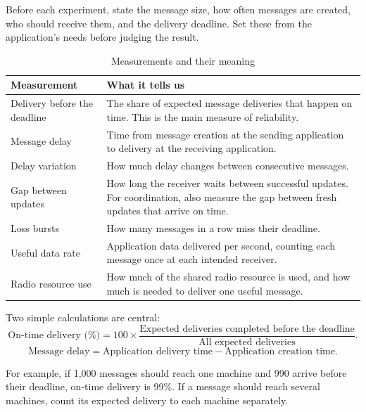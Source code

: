 \documentclass[11pt,a4paper]{article}
\begin{document}
Before each experiment, state the message size, how often messages are
created, who should receive them, and the delivery deadline. Set these from
the application's needs before judging the result.

\begin{table}[htbp]
\centering
\caption{Measurements and their meaning}
\label{tab:metrics}
\small
\begin{tabularx}{\textwidth}{lY}
\toprule
\textbf{Measurement} & \textbf{What it tells us} \\
\midrule
Delivery before the deadline &
The share of expected message deliveries that happen on time. This is the
main measure of reliability. \\
Message delay &
Time from message creation at the sending application to delivery at the
receiving application. \\
Delay variation &
How much delay changes between consecutive messages. \\
Gap between updates &
How long the receiver waits between successful updates. For coordination,
also measure the gap between fresh updates that arrive on time. \\
Loss bursts &
How many messages in a row miss their deadline. \\
Useful data rate &
Application data delivered per second, counting each message once at each
intended receiver. \\
Radio resource use &
How much of the shared radio resource is used, and how much is needed to
deliver one useful message. \\
\bottomrule
\end{tabularx}
\end{table}

Two simple calculations are central:
\begin{equation}
\text{On-time delivery (\%)} =
100 \times
\frac{\text{Expected deliveries completed before the deadline}}
     {\text{All expected deliveries}}.
\label{eq:delivery}
\end{equation}
\begin{equation}
\text{Message delay} =
\text{Application delivery time} - \text{Application creation time}.
\label{eq:delay}
\end{equation}

For example, if 1,000 messages should reach one machine and 990 arrive before
their deadline, on-time delivery is 99\%. If a message should reach several
machines, count its expected delivery to each machine separately.
\end{document}
